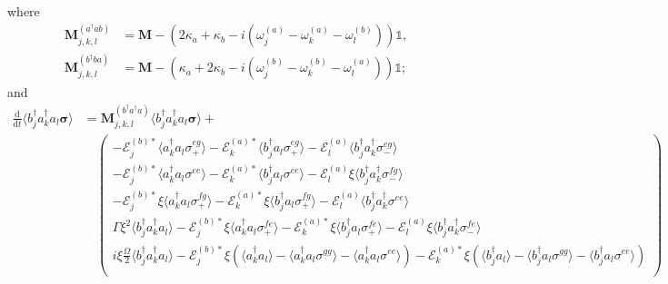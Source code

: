 \documentclass{article}
\newcommand{\ddt}[1][]{\frac{\mathrm{d} #1}{\mathrm{d}t}}
\begin{document}
where
\begin{subequations}
	\begin{align}
		\bm{M}_{j, k, l}^{(a^{\dagger} a b)} &= \bm{M} - \left( 2 \kappa_{a} + \kappa_{b} - i \left( \omega_{j}^{(a)} - \omega_{k}^{(a)} - \omega_{l}^{(b)} \right) \right) \mathbb{1}, \\
		\bm{M}_{j, k, l}^{(b^{\dagger} b a)} &= \bm{M} - \left( \kappa_{a} + 2 \kappa_{b} - i \left( \omega_{j}^{(b)} - \omega_{k}^{(b)} - \omega_{l}^{(a)} \right) \right) \mathbb{1};
	\end{align}
\end{subequations}
and
\begin{subequations}
	\begin{align}
		\ddt \langle b^{\dagger}_{j} a^{\dagger}_{k} a_{l} \bm{\sigma} \rangle &= \bm{M}_{j, k, l}^{(b^{\dagger} a^{\dagger} a)} \langle b^{\dagger}_{j} a^{\dagger}_{k} a_{l} \bm{\sigma} \rangle + \nonumber \\
		&\quad
		\begin{pmatrix}
			-\mathcal{E}_{j}^{(b) *} \langle a^{\dagger}_{k} a_{l} \sigma^{eg}_{+} \rangle - \mathcal{E}_{k}^{(a) *} \langle b^{\dagger}_{j} a_{l} \sigma^{eg}_{+} \rangle - \mathcal{E}_{l}^{(a)} \langle b^{\dagger}_{j} a^{\dagger}_{k} \sigma^{eg}_{-} \rangle \\
			-\mathcal{E}_{j}^{(b) *} \langle a^{\dagger}_{k} a_{l} \sigma^{ee} \rangle - \mathcal{E}_{k}^{(a) *} \langle b^{\dagger}_{j} a_{l} \sigma^{ee} \rangle - \mathcal{E}_{l}^{(a)} \xi \langle b^{\dagger}_{j} a^{\dagger}_{k} \sigma^{fg}_{-} \rangle \\
			-\mathcal{E}_{j}^{(b) *} \xi \langle a^{\dagger}_{k} a_{l} \sigma^{fg}_{+} \rangle - \mathcal{E}_{k}^{(a) *} \xi \langle b^{\dagger}_{j} a_{l} \sigma^{fg}_{+} \rangle - \mathcal{E}_{l}^{(a)} \langle b^{\dagger}_{j} a^{\dagger}_{k} \sigma^{ee} \rangle \\
			\Gamma \xi^{2} \langle b^{\dagger}_{j} a^{\dagger}_{k} a_{l} \rangle - \mathcal{E}_{j}^{(b) *} \xi \langle a^{\dagger}_{k} a_{l} \sigma^{fe}_{+} \rangle - \mathcal{E}_{k}^{(a) *} \xi \langle b^{\dagger}_{j} a_{l} \sigma^{fe}_{+} \rangle  - \mathcal{E}_{l}^{(a)} \xi \langle b^{\dagger}_{j} a^{\dagger}_{k} \sigma^{fe}_{-} \rangle\\
			i \xi \frac{\Omega}{2} \langle b^{\dagger}_{j} a^{\dagger}_{k} a_{l} \rangle - \mathcal{E}_{j}^{(b) *} \xi \left( \langle a^{\dagger}_{k} a_{l} \rangle - \langle a^{\dagger}_{k} a_{l} \sigma^{gg} \rangle - \langle a^{\dagger}_{k} a_{l} \sigma^{ee} \rangle \right)  - \mathcal{E}_{k}^{(a) *} \xi \left( \langle b^{\dagger}_{j} a_{l} \rangle - \langle b^{\dagger}_{j} a_{l} \sigma^{gg} \rangle - \langle b^{\dagger}_{j} a_{l} \sigma^{ee} \rangle \right) \\

\end{pmatrix}
\end{align}
\end{subequations}
\end{document}
